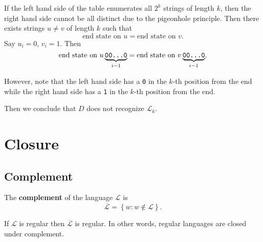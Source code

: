 \documentclass{notes}
\begin{document}
\begin{prf}
\begin{oldenumerate}[topsep = 0ex, label = {(\alph*)}]
    If the left hand side of the table enumerates all $2^k$ strings of length $k$, then the right hand side cannot be all distinct due to the pigeonhole principle.
    Then there exists strings $u \neq v$ of length $k$ such that 
    \[
      \text{end state on $u$} = \text{end state on $v$}.
    \]
    Say $u_i = 0$, $v_i = 1$.
    Then 
    \[
      \text{end state on $u \underbrace{\verb~00...0~}_{i - 1}$} = \text{end state on $v \underbrace{\verb~00...0~}_{i - 1}$}.
    \]
    
    However, note that the left hand side has a \verb~0~ in the $k$-th position from the end while the right hand side has a \verb~1~ in the $k$-th position from the end.

    Then we conclude that $D$ does not recognize $\mathcal L_k$.
  \end{oldenumerate}
\end{prf}

\newpage

\section{Closure}

\subsection{Complement}

\begin{center}
\end{center}

\begin{defn}
  The {\boldmath \bfseries complement}  of the language $\mathcal L$ is 
  \[
    \overline{\mathcal L} = \left \{ w : w \not \in \mathcal L \right \}.
  \]
\end{defn}

\begin{thm}
  If $\mathcal L$ is regular then $\overline{\mathcal L}$ is regular.
  In other words, regular languages are closed under complement.
\end{thm}
\end{document}

